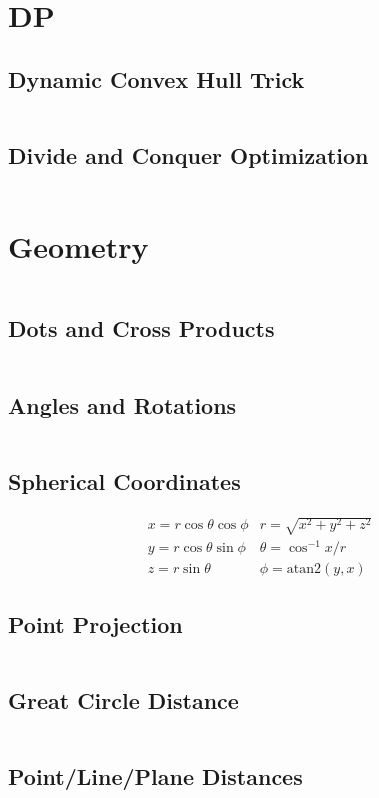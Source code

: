 \documentclass[8pt,a4paper,landscape,oneside]{amsart}
\newcommand{\code}[1]{\inputminted[fontsize=\normalsize,baselinestretch=1]{cpp}{_code/#1}}
\begin{document}
\begin{multicols*}{3}
\section{DP}
  \subsection{Dynamic Convex Hull Trick}
    \code{dp/dynamic-ch-trick.cpp}
  \subsection{Divide and Conquer Optimization}
    \code{dp/divide-conquer-opt.cpp}
\section{Geometry}
  \code{geom/compgeom.cpp}
	\subsection{Dots and Cross Products}
    \code{geom/dot-cross.cpp}
  \subsection{Angles and Rotations}
    \code{geom/angles-rots.cpp}
	\subsection{Spherical Coordinates}
    \[
        \begin{array}{cc}
            x = r \cos \theta \cos \phi & r = \sqrt{x^2 + y^2 + z^2} \\
            y = r \cos \theta \sin \phi & \theta = \cos^{-1} x/r \\
            z = r \sin \theta & \phi = \mathrm{atan2}(y,x)
        \end{array}
    \]
	\subsection{Point Projection}
    \code{geom/pt-proj.cpp}
	\subsection{Great Circle Distance}
    \code{geom/great-circle.cpp}
	\subsection{Point/Line/Plane Distances}
    \code{geom/dists.cpp}

\end{multicols*}
\end{document}
